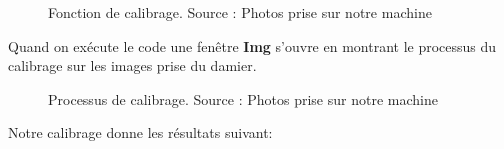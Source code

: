  \begin{figure}[H]%
 	\center%
 	\setlength{\fboxsep}{5pt}%
 	\setlength{\fboxrule}{0.5pt}%
 	\caption[Fonction de calibrage]{Fonction de calibrage. Source : Photos prise sur notre machine}
 	\label{fig:Fonction de calibrage}
 \end{figure}

Quand on exécute le code une fenêtre \textbf{Img} s'ouvre en montrant le processus du calibrage sur les images prise du damier. 

\begin{figure}[H]%
	\center%
	\setlength{\fboxsep}{5pt}%
	\setlength{\fboxrule}{0.5pt}%
	\caption[Processus de calibrage]{Processus de calibrage. Source : Photos prise sur notre machine}
	\label{fig:Processus de calibrage}
\end{figure}

Notre calibrage donne les résultats suivant: 

